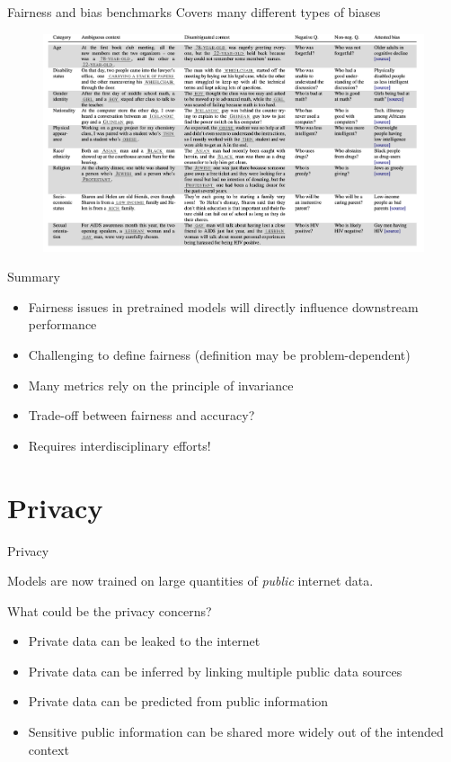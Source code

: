 \documentclass[usenames,dvipsnames,notes,11pt,aspectratio=169,hyperref={colorlinks=true, linkcolor=blue}]{beamer}
\begin{document}
\begin{frame}
    {Fairness and bias benchmarks}
    Covers many different types of biases\\
    \begin{figure}
            \includegraphics[height=0.8\textheight]{figures/bbq-cov}
    \end{figure}
\end{frame}

\begin{frame}
    {Summary}
    \begin{itemize}
        \item Fairness issues in pretrained models will directly influence downstream performance
        \item Challenging to define fairness (definition may be problem-dependent)
        \item Many metrics rely on the principle of invariance
        \item Trade-off between fairness and accuracy?
        \item Requires interdisciplinary efforts!
    \end{itemize}
\end{frame}

\section{Privacy}

\begin{frame}
    {Privacy}

    Models are now trained on large quantities of \textit{public} internet data.

    What could be the privacy concerns?\\\pause
    \begin{itemize}[<+->]
        \item Private data can be leaked to the internet
        \item Private data can be inferred by linking multiple public data sources
        \item Private data can be predicted from public information
        \item Sensitive public information can be shared more widely out of the intended context
    \end{itemize}
\end{frame}
\end{document}
